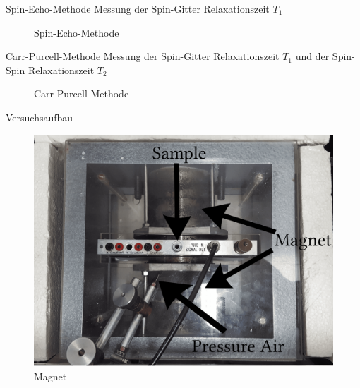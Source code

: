 \begin{frame}{Spin-Echo-Methode}
Messung der Spin-Gitter Relaxationszeit $T_1$
	\begin{figure}
	\centering
	
	\caption{Spin-Echo-Methode}
	\end{figure}
\end{frame}

\begin{frame}{Carr-Purcell-Methode}
Messung der Spin-Gitter Relaxationszeit $T_1$ und der Spin-Spin Relaxationszeit $T_2$
	\begin{figure}
	\centering
	\caption{Carr-Purcell-Methode}
	\end{figure}
\end{frame}

\begin{frame}{Versuchsaufbau}
	\begin{figure}
	\centering
	\includegraphics[scale=.075]{images//magnet.png}
	\caption{Magnet}
	\end{figure}
\end{frame}

